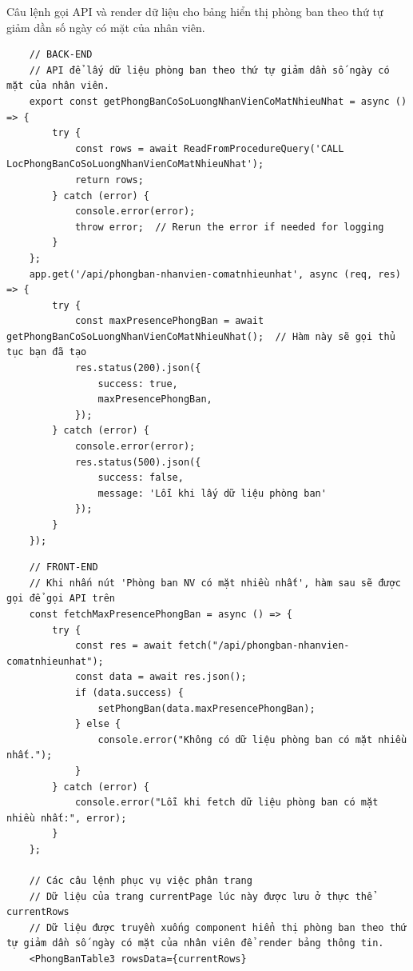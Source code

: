 \newpage
Câu lệnh gọi API và render dữ liệu cho bảng hiển thị phòng ban theo thứ tự giảm dần số ngày có mặt của nhân viên.
\begin{verbatim}
    // BACK-END
    // API để lấy dữ liệu phòng ban theo thứ tự giảm dần số ngày có mặt của nhân viên.
    export const getPhongBanCoSoLuongNhanVienCoMatNhieuNhat = async () => {
        try {
            const rows = await ReadFromProcedureQuery('CALL LocPhongBanCoSoLuongNhanVienCoMatNhieuNhat');
            return rows;
        } catch (error) {
            console.error(error);
            throw error;  // Rerun the error if needed for logging
        }
    };
    app.get('/api/phongban-nhanvien-comatnhieunhat', async (req, res) => {
        try {
            const maxPresencePhongBan = await getPhongBanCoSoLuongNhanVienCoMatNhieuNhat();  // Hàm này sẽ gọi thủ tục bạn đã tạo
            res.status(200).json({
                success: true,
                maxPresencePhongBan,
            });
        } catch (error) {
            console.error(error);
            res.status(500).json({ 
                success: false, 
                message: 'Lỗi khi lấy dữ liệu phòng ban' 
            });
        }
    });
\end{verbatim}
\begin{verbatim}
    // FRONT-END
    // Khi nhấn nút 'Phòng ban NV có mặt nhiều nhất', hàm sau sẽ được gọi để gọi API trên
    const fetchMaxPresencePhongBan = async () => {
        try {
            const res = await fetch("/api/phongban-nhanvien-comatnhieunhat");
            const data = await res.json();
            if (data.success) {
                setPhongBan(data.maxPresencePhongBan);
            } else {
                console.error("Không có dữ liệu phòng ban có mặt nhiều nhất.");
            }
        } catch (error) {
            console.error("Lỗi khi fetch dữ liệu phòng ban có mặt nhiều nhất:", error);
        }
    };

    // Các câu lệnh phục vụ việc phân trang
    // Dữ liệu của trang currentPage lúc này được lưu ở thực thể currentRows
    // Dữ liệu được truyền xuống component hiển thị phòng ban theo thứ tự giảm dần số ngày có mặt của nhân viên để render bảng thông tin.
    <PhongBanTable3 rowsData={currentRows}
\end{verbatim}

\newpage